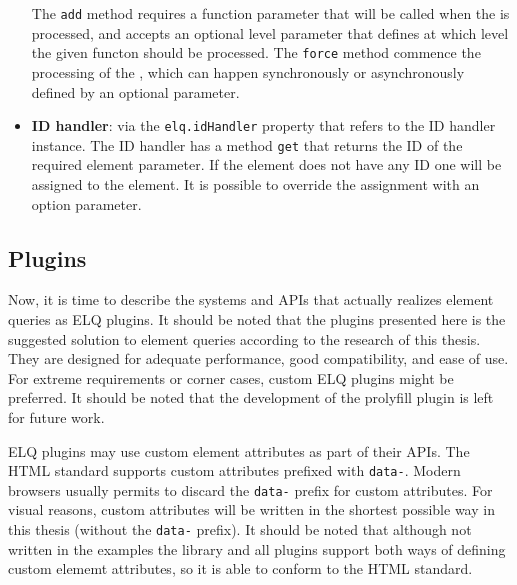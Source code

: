 \documentclass[a4paper,11pt]{kth-mag}
\newcommand{\code}[1]{\texttt{#1}}
\newcommand\abbr[2][]{\uppercase{#2}\ifthenelse{\equal{#1}{}}%
                     {}{#1}}
\begin{document}
\begin{itemize}
            The \code{add} method requires a function parameter that will be called when the  is processed, and accepts an optional level parameter that defines at which level the given functon should be processed.
            The \code{force} method commence the processing of the , which can happen synchronously or asynchronously defined by an optional parameter.
          \item
            \textbf{\abbr{ID} handler}: via the \code{elq.idHandler} property that refers to the \abbr{ID} handler instance. 
            The \abbr{ID} handler has a method \code{get} that returns the \abbr{ID} of the required element parameter.
            If the element does not have any \abbr{ID} one will be assigned to the element.
            It is possible to override the assignment with an option parameter.
        \end{itemize}
      \subsection{Plugins}
        Now, it is time to describe the systems and \glspl{API} that actually realizes element queries as \gls{ELQ} plugins.
        It should be noted that the plugins presented here is the suggested solution to element queries according to the research of this thesis.
        They are designed for adequate performance, good compatibility, and ease of use.
        For extreme requirements or corner cases, custom \gls{ELQ} plugins might be preferred.
        It should be noted that the development of the prolyfill plugin is left for future work.

        \Gls{ELQ} plugins may use custom element attributes as part of their \glspl{API}.
        The \gls{HTML} standard supports custom attributes prefixed with \code{data-}.
        Modern browsers usually permits to discard the \code{data-} prefix for custom attributes.
        For visual reasons, custom attributes will be written in the shortest possible way in this thesis (without the \code{data-} prefix).
        It should be noted that although not written in the examples the library and all plugins support both ways of defining custom elememt attributes, so it is able to conform to the \gls{HTML} standard.
\end{document}
